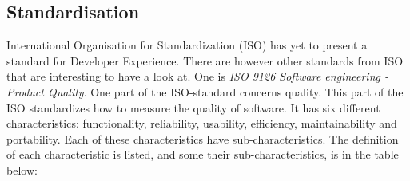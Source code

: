 \documentclass{article}
\begin{document}
\subsection{Standardisation}
International Organisation for Standardization (ISO) has yet to present a
standard for Developer Experience. There are however other standards from ISO
that are interesting to have a look at. One is \textit{ISO 9126 Software engineering - Product Quality}.
One part of the ISO-standard concerns quality. This part of the ISO standardizes how to measure the quality of software.
It has six different characteristics: functionality, reliability, usability, efficiency, maintainability and
portability. Each of these characteristics have sub-characteristics. The definition of each
characteristic is listed, and some their sub-characteristics, is in the table below:
\end{document}
